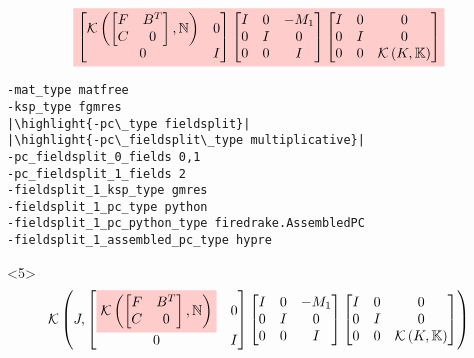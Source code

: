 \documentclass[presentation]{beamer}
\newcommand{\KSP}[2]{\ensuremath{\mathcal{K}\left(#1, \mathbb{#2}\right)}}
\newcommand{\ksp}[1]{\KSP{#1}{#1}}
\newcommand{\highlight}[1]{\colorbox{red!20}{\color{black} #1}}
\begin{document}
\begin{frame}[fragile]
\begin{onlyenv}
\begin{equation*}
{      \highlight{$\begin{bmatrix}
        \KSP{\begin{bmatrix}
            F & B^T\\
            C & 0
          \end{bmatrix}}{N} & 0\\
        0 & I
      \end{bmatrix}
      \begin{bmatrix}
        I & 0 & -M_1\\
        0 & I & 0 \\
        0 & 0 & I
      \end{bmatrix}
      \begin{bmatrix}
        I & 0 & 0\\
        0 & I & 0\\
        0 & 0 &\ksp{K}
      \end{bmatrix}$}}
    \end{equation*}
\begin{verbatim}
-mat_type matfree
-ksp_type fgmres
|\highlight{-pc\_type fieldsplit}|
|\highlight{-pc\_fieldsplit\_type multiplicative}|
-pc_fieldsplit_0_fields 0,1
-pc_fieldsplit_1_fields 2
-fieldsplit_1_ksp_type gmres
-fieldsplit_1_pc_type python
-fieldsplit_1_pc_python_type firedrake.AssembledPC
-fieldsplit_1_assembled_pc_type hypre
\end{verbatim}
  \end{onlyenv}
  \begin{onlyenv}<5>
    \color{gray}
    \begin{equation*}
      \KSP{J}{%
      \begin{bmatrix}
        \highlight{$\KSP{\begin{bmatrix}
            F & B^T\\
            C & 0
          \end{bmatrix}}{N}$} & 0\\
        0 & I
      \end{bmatrix}
      \begin{bmatrix}
        I & 0 & -M_1\\
        0 & I & 0 \\
        0 & 0 & I
      \end{bmatrix}
      \begin{bmatrix}
        I & 0 & 0\\
        0 & I & 0\\
        0 & 0 &\ksp{K}
      \end{bmatrix}}

\end{equation*}
\end{onlyenv}
\end{frame}
\end{document}
